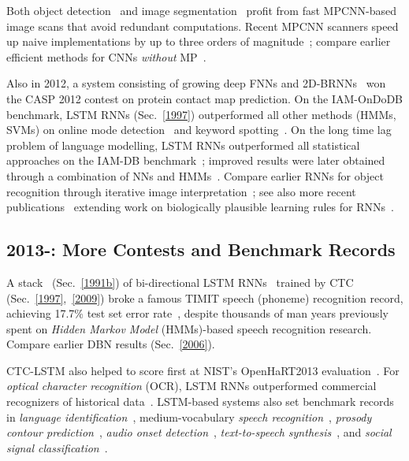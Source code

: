 \documentclass[letterpaper]{article}
\begin{document}
\begin{CJK*}{UTF8}{gbsn}
\begin{sloppypar}
Both object detection~\citep{miccai2013}  and image segmentation~\citep{ciresan2012nips}  
profit from fast MPCNN-based image scans that avoid redundant computations.
Recent MPCNN scanners  
speed up naive implementations  by up to 
three orders of magnitude~\citep{masci:2013icip,Giusti:2013a};
compare earlier efficient methods for CNNs {\em without} MP~\citep{vaillant-monrocq-lecun-94}.

Also in 2012,
a system consisting of  growing deep FNNs and 
2D-BRNNs~\citep{baldi2012contact} won the CASP 2012 contest
on protein contact map prediction.
On the IAM-OnDoDB benchmark,
LSTM RNNs (Sec.~\ref{1997}) outperformed all other methods (HMMs, SVMs) on 
online mode detection~\citep{otte2012local,indermuhle2012mode}
and keyword spotting~\citep{indermuhle2011keyword}.
On the long time lag problem of language modelling, LSTM RNNs 
outperformed all statistical approaches on the IAM-DB benchmark~\citep{frinken2012long};
improved results were later obtained through a combination of NNs and HMMs~\citep{zamora2014}.
Compare earlier RNNs for object 
recognition through iterative image interpretation~\citep{Behnke:IJCNN1998,Behnke:ICANN2002,Behnke:LNCS};
see also more recent publications~\citep{wyatte2012b,oreilly2013} extending
work on biologically plausible learning rules for RNNs~\citep{oreilly1996}.



\subsection{2013-: More Contests and Benchmark Records}
\label{2013}

A stack~\citep{Santi:07ijcai,graves:2009nips} (Sec.~\ref{1991b}) of bi-directional LSTM 
RNNs~\citep{graves05nn}  
trained by CTC (Sec.~\ref{1997},~\ref{2009}) 
broke a famous TIMIT speech (phoneme) recognition record, achieving 17.7\% test set error rate~\citep{graves:2013icassp}, despite thousands of man years previously spent on {\em Hidden Markov Model} (HMMs)-based speech recognition research. 
Compare earlier DBN results (Sec.~\ref{2006}).

CTC-LSTM also 
helped to score first at NIST's OpenHaRT2013 evaluation~\citep{bluche13}.
For {\em optical character recognition} (OCR), LSTM RNNs outperformed commercial 
recognizers of historical data~\citep{breuel2013high}.
LSTM-based systems  also set benchmark records in
{\em language identification}~\citep{gonzalez2014},
medium-vocabulary {\em speech recognition}~\citep{geiger2014},
{\em prosody contour prediction}~\citep{fernandez2014},
{\em audio onset detection}~\citep{marchi2014},
{\em text-to-speech synthesis}~\citep{fan2014}, and
{\em social signal classification}~\citep{brueckner2014}.


\end{sloppypar}
\end{CJK*}
\end{document}
